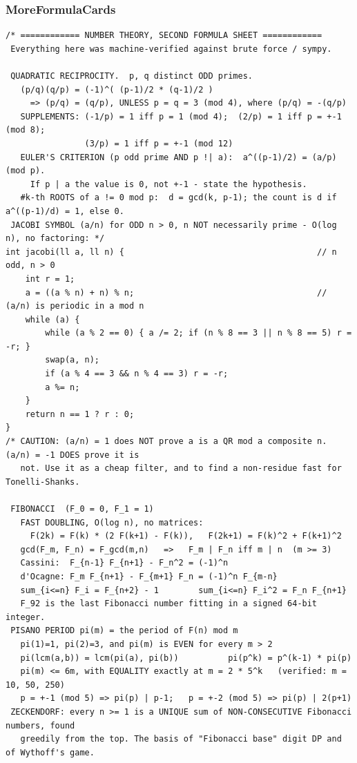 \documentclass[9pt,a4paper,twocolumn]{extarticle}
\begin{document}
\filbreak
\subsubsection{MoreFormulaCards}
\nopagebreak
\begin{lstlisting}
/* ============ NUMBER THEORY, SECOND FORMULA SHEET ============
 Everything here was machine-verified against brute force / sympy.

 QUADRATIC RECIPROCITY.  p, q distinct ODD primes.
   (p/q)(q/p) = (-1)^( (p-1)/2 * (q-1)/2 )
     => (p/q) = (q/p), UNLESS p = q = 3 (mod 4), where (p/q) = -(q/p)
   SUPPLEMENTS: (-1/p) = 1 iff p = 1 (mod 4);  (2/p) = 1 iff p = +-1 (mod 8);
                (3/p) = 1 iff p = +-1 (mod 12)
   EULER'S CRITERION (p odd prime AND p !| a):  a^((p-1)/2) = (a/p) (mod p).
     If p | a the value is 0, not +-1 - state the hypothesis.
   #k-th ROOTS of a != 0 mod p:  d = gcd(k, p-1); the count is d if a^((p-1)/d) = 1, else 0.
 JACOBI SYMBOL (a/n) for ODD n > 0, n NOT necessarily prime - O(log n), no factoring: */
int jacobi(ll a, ll n) {                                       // n odd, n > 0
    int r = 1;
    a = ((a % n) + n) % n;                                     // (a/n) is periodic in a mod n
    while (a) {
        while (a % 2 == 0) { a /= 2; if (n % 8 == 3 || n % 8 == 5) r = -r; }
        swap(a, n);
        if (a % 4 == 3 && n % 4 == 3) r = -r;
        a %= n;
    }
    return n == 1 ? r : 0;
}
/* CAUTION: (a/n) = 1 does NOT prove a is a QR mod a composite n. (a/n) = -1 DOES prove it is
   not. Use it as a cheap filter, and to find a non-residue fast for Tonelli-Shanks.

 FIBONACCI  (F_0 = 0, F_1 = 1)
   FAST DOUBLING, O(log n), no matrices:
     F(2k) = F(k) * (2 F(k+1) - F(k)),   F(2k+1) = F(k)^2 + F(k+1)^2
   gcd(F_m, F_n) = F_gcd(m,n)   =>   F_m | F_n iff m | n  (m >= 3)
   Cassini:  F_{n-1} F_{n+1} - F_n^2 = (-1)^n
   d'Ocagne: F_m F_{n+1} - F_{m+1} F_n = (-1)^n F_{m-n}
   sum_{i<=n} F_i = F_{n+2} - 1        sum_{i<=n} F_i^2 = F_n F_{n+1}
   F_92 is the last Fibonacci number fitting in a signed 64-bit integer.
 PISANO PERIOD pi(m) = the period of F(n) mod m
   pi(1)=1, pi(2)=3, and pi(m) is EVEN for every m > 2
   pi(lcm(a,b)) = lcm(pi(a), pi(b))          pi(p^k) = p^(k-1) * pi(p)
   pi(m) <= 6m, with EQUALITY exactly at m = 2 * 5^k   (verified: m = 10, 50, 250)
   p = +-1 (mod 5) => pi(p) | p-1;   p = +-2 (mod 5) => pi(p) | 2(p+1)
 ZECKENDORF: every n >= 1 is a UNIQUE sum of NON-CONSECUTIVE Fibonacci numbers, found
   greedily from the top. The basis of "Fibonacci base" digit DP and of Wythoff's game.


\end{lstlisting}
\end{document}
